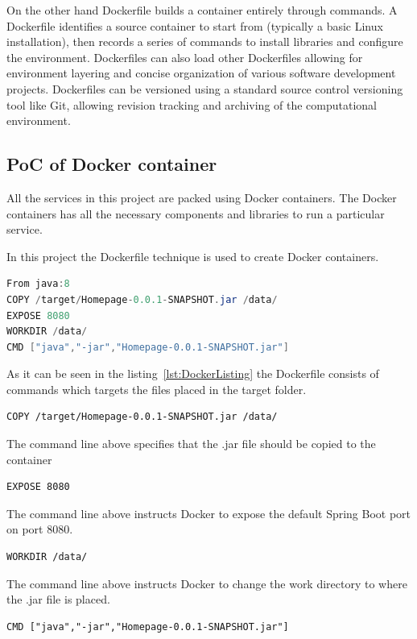 On the other hand Dockerfile builds a container entirely through commands. A Dockerfile identifies a source container to start from (typically a basic Linux installation), then records a series of commands to install libraries and configure the environment. Dockerfiles can also load other Dockerfiles allowing for environment layering and concise organization of various software development projects. Dockerfiles can be versioned using a standard source control versioning tool like Git, allowing revision tracking and archiving of the computational environment.\\

\subsection{PoC of Docker container}
All the services in this project are packed using Docker containers. The Docker containers has all the necessary components and libraries to run a particular service. 

In this project the Dockerfile technique is used to create Docker containers. \cite{Docker2014}

\begin{lstlisting}[frame=single,caption={Dockerfile with command to be carried out},label={{lst:DockerListing}},language=Java]
From java:8
COPY /target/Homepage-0.0.1-SNAPSHOT.jar /data/
EXPOSE 8080
WORKDIR /data/
CMD ["java","-jar","Homepage-0.0.1-SNAPSHOT.jar"]
\end{lstlisting}

As it can be seen in the listing~\ref{lst:DockerListing} the Dockerfile consists of commands which targets the files placed in the target folder. 




\begin{lstlisting}[frame=single]
  COPY /target/Homepage-0.0.1-SNAPSHOT.jar /data/
\end{lstlisting}
The command line above specifies that the .jar file should be copied to the container

\begin{lstlisting}[frame=single]
  EXPOSE 8080
\end{lstlisting}

The command line above instructs Docker to expose the default Spring Boot port on port 8080. 
\begin{lstlisting}[frame=single]
  WORKDIR /data/
\end{lstlisting}


The command line above instructs Docker to change the work directory to where the .jar file is placed. 
\begin{lstlisting}[frame=single]
  CMD ["java","-jar","Homepage-0.0.1-SNAPSHOT.jar"]
  
\end{lstlisting}

